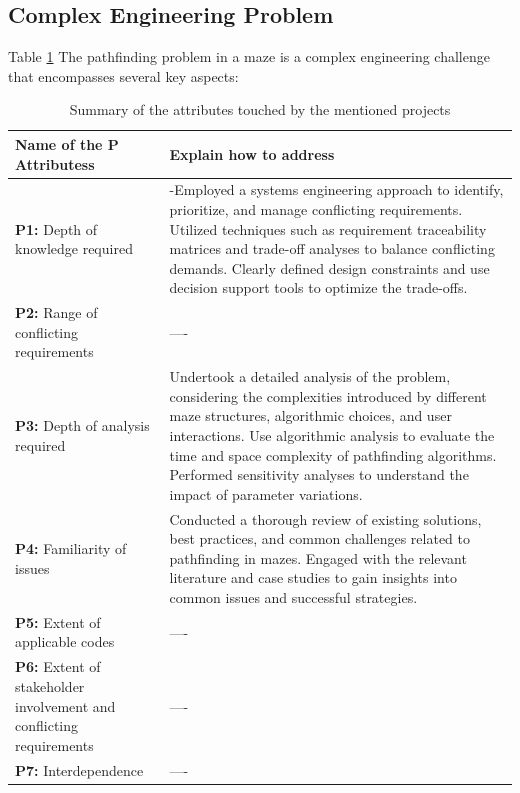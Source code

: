 \documentclass[12pt]{report}
\begin{document}
\subsection{Complex Engineering Problem}
Table \ref{tab:CEP}
The pathfinding problem in a maze is a complex engineering challenge that encompasses several key aspects:


\begin{table}[htbp]
   \centering
    \caption{Summary of the attributes touched by the mentioned projects}
    \begin{tabular}{|p{6.0 cm}|p{8 cm}|}
    \toprule
        \textbf{Name of the P Attributess} & \textbf{Explain how to address}  \\
        \midrule

    \textbf{P1:} Depth of knowledge required  &  -Employed a systems engineering approach to identify, prioritize, and manage conflicting requirements. Utilized techniques such as requirement traceability matrices and trade-off analyses to balance conflicting demands. Clearly defined design constraints and use decision support tools to optimize the trade-offs. \\
      \hline
       
    \textbf{P2:} Range of conflicting
     requirements  &  ---- \\
      \hline

    \textbf{P3:} Depth of analysis required  &  Undertook a detailed analysis of the problem, considering the complexities introduced by different maze structures, algorithmic choices, and user interactions. Use algorithmic analysis to evaluate the time and space complexity of pathfinding algorithms. Performed sensitivity analyses to understand the impact of parameter variations. \\
    \hline
    
    \textbf{P4:} Familiarity of issues  &  Conducted a thorough review of existing solutions, best practices, and common challenges related to pathfinding in mazes. Engaged with the relevant literature and case studies to gain insights into common issues and successful strategies. \\ 
    \hline
    \textbf{P5:} Extent of applicable codes  &  ---- \\
      \hline
       
    \textbf{P6:} Extent of stakeholder
     involvement and conflicting
     requirements  &  ---- \\
      \hline

    \textbf{P7:} Interdependence  &  ---- \\
    \hline
        
    \end{tabular}
    \label{tab:CEP}
\end{table}
\end{document}
